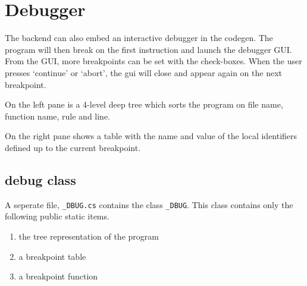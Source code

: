 \section{Debugger}

The backend can also embed an interactive debugger in the codegen.
The program will then break on the first instruction and launch the debugger GUI.
From the GUI, more breakpoints can be set with the check-boxes.
When the user presses `continue' or `abort', the gui will close and appear again on the next breakpoint.

On the left pane is a 4-level deep tree which sorts the program on file name, function name, rule and line.

On the right pane shows a table with the name and value of the local identifiers defined up to the current breakpoint.

\subsection{debug class}

A seperate file, \verb|_DBUG.cs| contains the class \verb|_DBUG|.
This class contains only the following public static items.

\begin{enumerate}
    \item the tree representation of the program
    \item a breakpoint table
    \item a breakpoint function
\end{enumerate}

